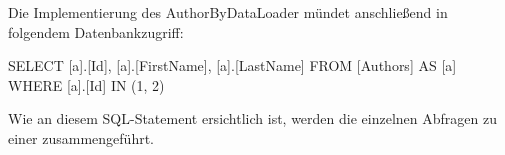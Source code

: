 Die Implementierung des AuthorByDataLoader mündet anschließend in folgendem Datenbankzugriff:
\begin{JsCode}
SELECT [a].[Id], [a].[FirstName], [a].[LastName]
FROM [Authors] AS [a]
WHERE [a].[Id] IN (1, 2)
\end{JsCode}

Wie an diesem SQL-Statement ersichtlich ist, werden die einzelnen Abfragen zu einer zusammengeführt.